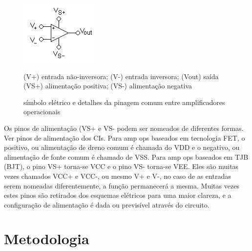 \begin{figure}[!ht]
\label{pinout}
\includegraphics[width=0.5\linewidth]{pinout.png}
\caption{símbolo elétrico e detalhes da pinagem comum entre amplificadores operacionais}
(V+) entrada não-inversora; (V-) entrada inversora; (Vout) saída (VS+) alimentação positiva; (VS-) alimentação negativa
\end{figure}

Os pinos de alimentação (VS+ e VS- podem ser nomeados de diferentes formas. Ver pinos de alimentação dos CIs. Para amp ops baseados em tecnologia FET, o positivo, ou alimentação de dreno comum é chamada do VDD e o negativo, ou alimentação de fonte comum é chamado de VSS. Para amp ops baseados em TJB (BJT), o pino VS+ torna-se VCC e o pino VS- torna-se VEE. Eles são muitas vezes chamados VCC+ e VCC-, ou mesmo V+ e V-, no caso de as entradas serem nomeadas diferentemente, a função permanecerá a mesma. Muitas vezes estes pinos são retirados dos esquemas elétricos para uma maior clareza, e a configuração de alimentação é dada ou previsível através do circuito.



\newpage
\section{Metodologia}

